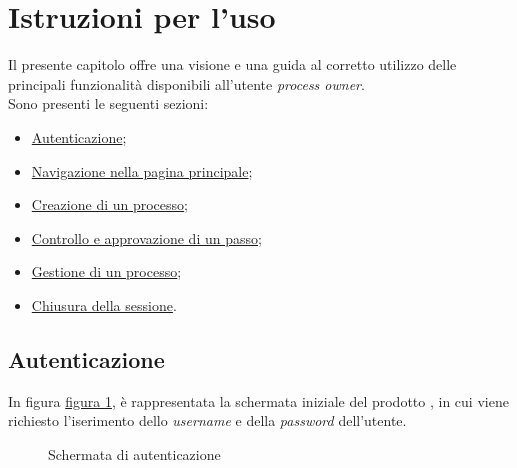 \section{Istruzioni per l'uso}
\label{istruzioni}

Il presente capitolo offre una visione e una guida al corretto utilizzo delle principali funzionalità disponibili all'utente \textit{process owner}.\\
Sono presenti le seguenti sezioni:

\begin{itemize}
\item  \hyperref[autenticazione]{Autenticazione};
\item  \hyperref[home]{Navigazione nella pagina principale};
\item  \hyperref[creazione]{Creazione di un processo};
\item  \hyperref[controllo]{Controllo e approvazione di un passo};
\item  \hyperref[gestione]{Gestione di un processo};
\item  \hyperref[logout]{Chiusura della sessione}.
\end{itemize}

\pagebreak

\subsection{Autenticazione}
\label{autenticazione}

In figura \hyperref[fig:Flogin]{figura \ref{fig:Flogin}}, è rappresentata la schermata iniziale del prodotto \progetto{}, in cui viene richiesto l'iserimento dello \textit{username} e della \textit{password} dell'utente.

\begin{figure}[H] \centering 
{} \caption{Schermata di autenticazione}
\label{fig:Flogin}
\end{figure}

